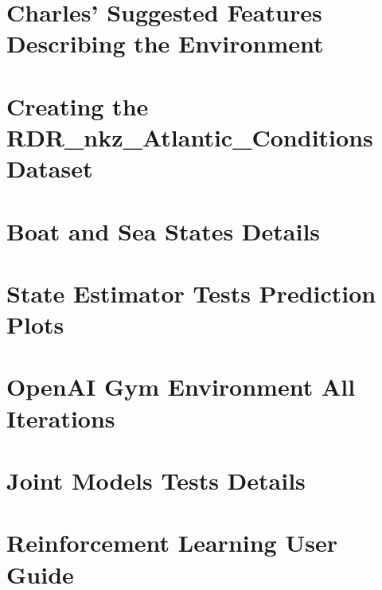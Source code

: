 \documentclass[12pt,twoside]{report}
\begin{document}
\chapter{Charles' Suggested Features Describing the Environment}
\label{app:essential-features}


\chapter{Creating the RDR\_nkz\_Atlantic\_Conditions Dataset}


\chapter{Boat and Sea States Details}


\chapter{State Estimator Tests Prediction Plots}


\chapter{OpenAI Gym Environment All Iterations}


\chapter{Joint Models Tests Details}
\label{app:joint}


\chapter{Reinforcement Learning User Guide}

\end{document}
